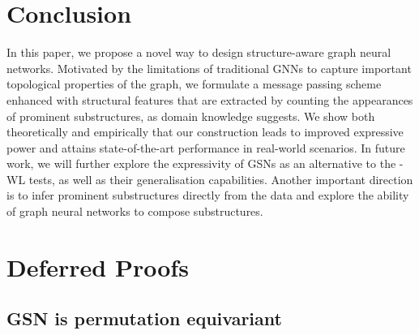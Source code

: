 \documentclass{article} \usepackage{iclr2021_conference,times}
\begin{document}
\section{Conclusion}

In this paper, we propose a novel way to design structure-aware graph neural networks. Motivated by the limitations of traditional GNNs to capture important topological properties of the graph, we formulate a message passing scheme enhanced with structural features that are extracted by counting the appearances of prominent substructures, as domain knowledge suggests. We show both theoretically and empirically that our construction leads to improved expressive power and attains state-of-the-art performance in real-world scenarios. In future work, we will further explore the expressivity of GSNs as an alternative to the -WL tests, as well as their generalisation capabilities. Another important direction is to infer prominent substructures directly from the data and explore the ability of graph neural networks to compose substructures.





\appendix

\section{Deferred Proofs} 


\subsection{GSN is permutation equivariant}\label{proof:perm_equiv}
\end{document}
